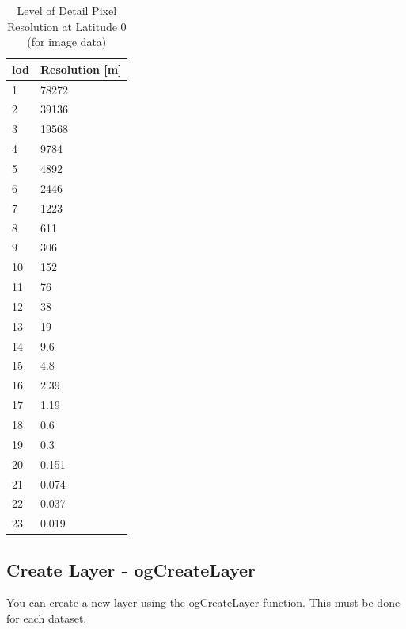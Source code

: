 \documentclass[
	12pt,
	a4paper,
	english,	
	appendixprefix,				     			        
	openany,		     	
	abstracton,		    		    
 	BCOR8mm,		    
]{scrartcl}
\begin{document}
\begin{table}[H]
\centering
\begin{tabular}{|l|l|}
\hline
\textbf{lod}	& \textbf{Resolution [m]}\\
\hline
1	& 78272\\
\hline
2	& 39136\\
\hline
3	& 19568\\
\hline
4	& 9784\\
\hline
5	& 4892\\
\hline
6	& 2446\\
\hline
7	& 1223\\
\hline
8	& 611\\
\hline
9	& 306\\
\hline
10	& 152\\
\hline
11	& 76\\
\hline
12	& 38\\
\hline
13	& 19\\
\hline
14	& 9.6\\
\hline
15	& 4.8\\
\hline
16	& 2.39\\
\hline
17	& 1.19\\
\hline
18	& 0.6\\
\hline
19	& 0.3\\
\hline
20	& 0.151\\
\hline
21	& 0.074\\
\hline
22	& 0.037\\
\hline
23	& 0.019\\
\hline
\end{tabular}
\caption{Level of Detail Pixel Resolution at Latitude 0 (for image data)}\label{tbl1}
\end{table}

\subsection{Create Layer - ogCreateLayer}\label{ogCreateLayer}

You can create a new layer using the ogCreateLayer function. This must be done for each dataset.
\end{document}
